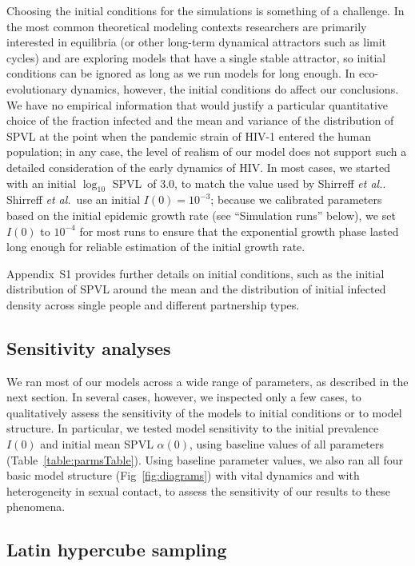 \documentclass[10pt,letterpaper]{article}
\renewcommand{\figurename}{Fig}
\newcommand{\Lspvl}{$\log_{10}$ SPVL}
\newcommand{\etal}{\textit{et al.}}
\begin{document}
Choosing the initial conditions for the simulations is something of a
challenge. In the most common theoretical modeling contexts
researchers are primarily interested in equilibria (or other long-term
dynamical attractors such as limit cycles) and are exploring models
that have a single stable attractor, so initial conditions can be
ignored as long as we run models for long enough.  In eco-evolutionary
dynamics, however, the initial conditions do affect our
conclusions. We have no empirical information that would justify a
particular quantitative choice of the fraction infected and the mean
and variance of the distribution of SPVL at the point when the
pandemic strain of HIV-1 entered the human population; in any case,
the level of realism of our model does not support such a detailed
consideration of the early dynamics of HIV.  In most cases, we started
with an initial \Lspvl\ of 3.0, to match the value used by
Shirreff \etal. Shirreff \etal\ use an initial $I(0)=10^{-3}$;
because we calibrated parameters based on the initial epidemic growth rate
(see ``Simulation runs'' below), we set $I(0)$ to $10^{-4}$
for most runs to ensure
that the exponential growth phase lasted long enough for reliable
estimation of the initial growth rate.

Appendix~S1 provides
further details on initial conditions, such
as the initial distribution of SPVL around the mean and the
distribution of initial infected density across single people
and different partnership types.

\subsection*{Sensitivity analyses}

We ran most of our models across a wide range of parameters, as described
in the next section. In several cases, however, we inspected only a few
cases, to qualitatively assess the sensitivity of the models to
initial conditions or to model structure. 
In particular, we tested model sensitivity 
to the initial prevalence $I(0)$ and initial mean SPVL
$\alpha(0)$, using baseline values of all parameters (Table~\ref{table:parmsTable}).
Using baseline parameter values,
we also ran all four basic model structure (\figurename~\ref{fig:diagrams})
with vital dynamics and with heterogeneity in sexual contact,
to assess the sensitivity of our results to these phenomena.

\subsection*{Latin hypercube sampling}
\end{document}
